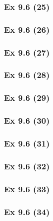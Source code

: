 \subsubsection{Ex 9.6 (25)}\label{sec:Ex_9.6.25}

\subsubsection{Ex 9.6 (26)}\label{sec:Ex_9.6.26}

\subsubsection{Ex 9.6 (27)}\label{sec:Ex_9.6.27}

\subsubsection{Ex 9.6 (28)}\label{sec:Ex_9.6.28}

\subsubsection{Ex 9.6 (29)}\label{sec:Ex_9.6.29}

\subsubsection{Ex 9.6 (30)}\label{sec:Ex_9.6.30}

\newpage		%

\subsubsection{Ex 9.6 (31)}\label{sec:Ex_9.6.31}

\subsubsection{Ex 9.6 (32)}\label{sec:Ex_9.6.32}

\subsubsection{Ex 9.6 (33)}\label{sec:Ex_9.6.33}

\subsubsection{Ex 9.6 (34)}\label{sec:Ex_9.6.34}

